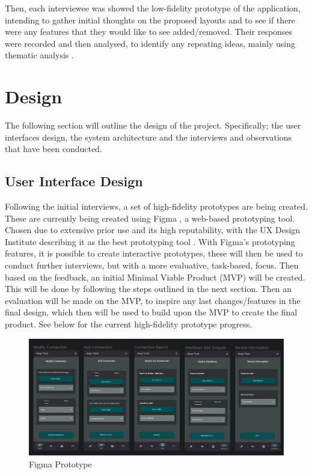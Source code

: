 \documentclass [11pt,a4paper]{article}
\begin{document}
Then, each interviewee was showed the low-fidelity prototype of the application, intending to gather initial thoughts on the proposed layouts and to see if there were any features that they would like to see added/removed. Their responses were recorded and then analysed, to identify any repeating ideas, mainly using thematic analysis \cite{thematicAnal}.

\section{Design}
\label{sec:design}
The following section will outline the design of the project. Specifically; the user interfaces design, the system architecture and the interviews and observations that have been conducted.

\subsection{User Interface Design}
\label{sec:ui_design}
Following the initial interviews, a set of high-fidelity prototypes are being created. These are currently being created using Figma \cite{figma}, a web-based prototyping tool. Chosen due to extensive prior use and its high reputability, with the UX Design Institute describing it as the best prototyping tool \cite{figmaUX}. With Figma's prototyping features, it is possible to create interactive prototypes, these will then be used to conduct further interviews, but with a more evaluative, task-based, focus. Then based on the feedback, an initial Minimal Viable Product (MVP) will be created. This will be done by following the steps outlined in the next section. Then an evaluation will be made on the MVP, to inspire any last changes/features in the final design, which then will be used to build upon the MVP to create the final product. See below for the current high-fidelity prototype progress.

\begin{figure}[H]
    \centering
    \includegraphics[width=1\textwidth]{images/figma_prototype.png}
    \caption{Figma Prototype}
    \label{fig:figma}
\end{figure}
\end{document}
